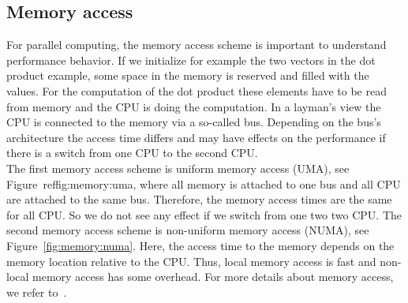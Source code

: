 \documentclass[11pt,fleqn]{book} %
\begin{document}
\subsection*{Memory access}
For parallel computing, the memory access scheme is important to understand performance behavior. If we initialize for example the two vectors in the dot product example, some space in the memory is reserved and filled with the values. For the computation of the dot product these elements have to be read from memory and the CPU is doing the computation. In a layman's view the CPU is connected to the memory via a so-called bus. Depending on the bus's architecture the access time differs and may have effects on the performance if there is a switch from one CPU to the second CPU.\\

The first memory access scheme is uniform memory access (UMA), see Figure~ref{fig:memory:uma},  where all memory is attached to one bus and all CPU are attached to the same bus. Therefore, the memory access times are the same for all CPU. So we do not see any effect if we switch from one two two CPU. The second memory access scheme is non-uniform memory access (NUMA), see Figure~\ref{fig:memory:numa}. Here, the access time to the memory depends on the memory location relative to the CPU. Thus, local memory access is fast and non-local memory access has some overhead. For more details about memory access, we refer to~\cite{el2005advanced,hager2010introduction}.
\end{document}
